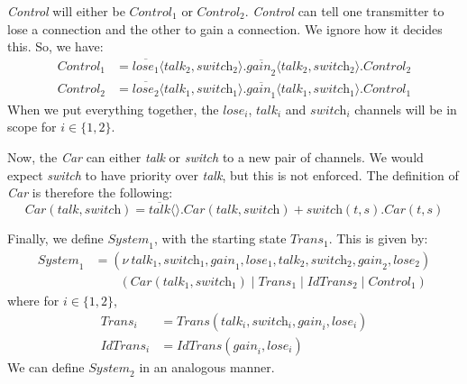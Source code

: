 \documentclass[a4paper, openany]{memoir}
\theoremstyle{definition}
\begin{document}
    \textit{Control} will either be $\textit{Control}_1$ or $\textit{Control}_2$. \textit{Control} can tell one transmitter to lose a connection and the other to gain a connection. We ignore how it decides this. So, we have:
    \begin{align*}
        \textit{Control}_1 &= \overline{\textit{lose}_1} \langle \textit{talk}_2, \textit{switch}_2 \rangle.\overline{\textit{gain}_2} \langle \textit{talk}_2, \textit{switch}_2 \rangle.\textit{Control}_2 \\
        \textit{Control}_2 &= \overline{\textit{lose}_2} \langle \textit{talk}_1, \textit{switch}_1 \rangle.\overline{\textit{gain}_1} \langle \textit{talk}_1, \textit{switch}_1 \rangle.\textit{Control}_1
    \end{align*}
    When we put everything together, the $\textit{lose}_i$, $\textit{talk}_i$ and $\textit{switch}_i$ channels will be in scope for $i \in \{1, 2\}$.

    Now, the \textit{Car} can either \textit{talk} or \textit{switch} to a new pair of channels. We would expect \textit{switch} to have priority over \textit{talk}, but this is not enforced. The definition of \textit{Car} is therefore the following:
    \[\textit{Car}(\textit{talk}, \textit{switch}) = \overline{\textit{talk}}\langle \rangle.\textit{Car} (\textit{talk}, \textit{switch}) + \textit{switch} (t, s).\textit{Car}(t, s)\]

    Finally, we define $\textit{System}_1$, with the starting state $\textit{Trans}_1$. This is given by:
    \begin{align*}
        \textit{System}_1 &= (\nu \ \textit{talk}_1, \textit{switch}_1, \textit{gain}_1, \textit{lose}_1, \textit{talk}_2, \textit{switch}_2, \textit{gain}_2, \textit{lose}_2) \\
        &\qquad (\textit{Car}(\textit{talk}_1, \textit{switch}_1) \mid \textit{Trans}_1 \mid \textit{IdTrans}_2 \mid \textit{Control}_1)
    \end{align*}
    where for $i \in \{1, 2\}$,
    \begin{align*}
        \textit{Trans}_i &= \textit{Trans}(\textit{talk}_i, \textit{switch}_i, \textit{gain}_i, \textit{lose}_i) \\
        \textit{IdTrans}_i &= \textit{IdTrans}(\textit{gain}_i, \textit{lose}_i) 
    \end{align*}
    We can define $\textit{System}_2$ in an analogous manner.
\end{document}
